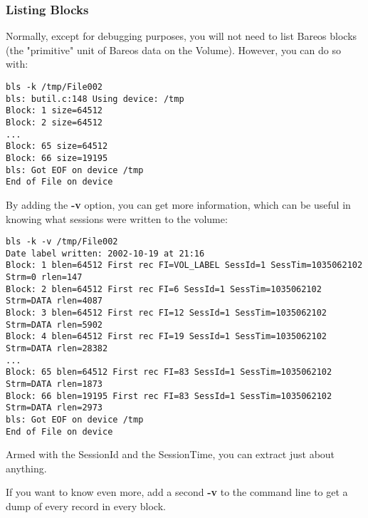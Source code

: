 \subsubsection{Listing Blocks}

Normally, except for debugging purposes, you will not need to list Bareos
blocks (the "primitive" unit of Bareos data on the Volume). However, you can
do so with:

\footnotesize
\begin{verbatim}
bls -k /tmp/File002
bls: butil.c:148 Using device: /tmp
Block: 1 size=64512
Block: 2 size=64512
...
Block: 65 size=64512
Block: 66 size=19195
bls: Got EOF on device /tmp
End of File on device
\end{verbatim}
\normalsize

By adding the {\bf -v} option, you can get more information, which can be
useful in knowing what sessions were written to the volume:

\footnotesize
\begin{verbatim}
bls -k -v /tmp/File002
Date label written: 2002-10-19 at 21:16
Block: 1 blen=64512 First rec FI=VOL_LABEL SessId=1 SessTim=1035062102 Strm=0 rlen=147
Block: 2 blen=64512 First rec FI=6 SessId=1 SessTim=1035062102 Strm=DATA rlen=4087
Block: 3 blen=64512 First rec FI=12 SessId=1 SessTim=1035062102 Strm=DATA rlen=5902
Block: 4 blen=64512 First rec FI=19 SessId=1 SessTim=1035062102 Strm=DATA rlen=28382
...
Block: 65 blen=64512 First rec FI=83 SessId=1 SessTim=1035062102 Strm=DATA rlen=1873
Block: 66 blen=19195 First rec FI=83 SessId=1 SessTim=1035062102 Strm=DATA rlen=2973
bls: Got EOF on device /tmp
End of File on device
\end{verbatim}
\normalsize

Armed with the SessionId and the SessionTime, you can extract just about
anything.

If you want to know even more, add a second {\bf -v} to the command line to
get a dump of every record in every block.

